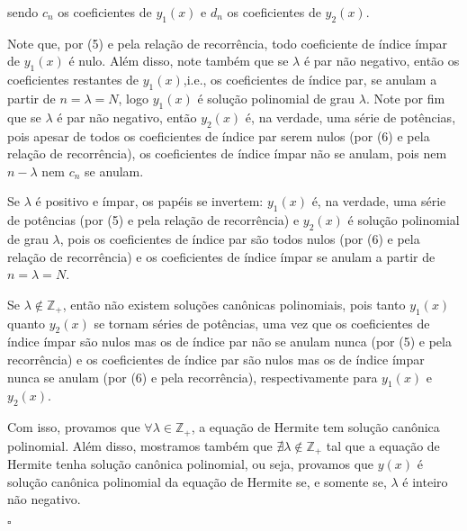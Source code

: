 \documentclass{article}
\begin{document}
sendo $c_n$ os coeficientes de $y_1(x)$ e $d_n$ os coeficientes de $y_2(x)$.
\vspace{0.2cm}
\par Note que, por (5) e pela relação de recorrência, todo coeficiente de índice ímpar de $y_1(x)$ é nulo. Além disso, note também que se $\lambda$ é par não negativo, então os coeficientes restantes de $y_1(x)$,i.e., os coeficientes de índice par, se anulam a partir de $n = \lambda = N$, logo $y_1(x)$ é solução polinomial de grau $\lambda$. Note por fim que se $\lambda $ é par não negativo, então $y_2(x)$ é, na verdade, uma série de potências, pois apesar de todos os coeficientes de índice par serem nulos (por (6) e pela relação de recorrência), os coeficientes de índice ímpar não se anulam, pois nem $n- \lambda$ nem $c_n$ se anulam. 
\vspace{0.2cm}
\par Se $\lambda$ é positivo e ímpar, os papéis se invertem: $y_1(x)$ é, na verdade, uma série de potências (por (5) e pela relação de recorrência) e $y_2(x)$ é solução polinomial de grau $\lambda$, pois os coeficientes de índice par são todos nulos (por (6) e pela relação de recorrência) e os coeficientes de índice ímpar se anulam a partir de $n = \lambda = N$. 
\vspace{0.2cm}
\par Se $\lambda\notin\mathbb{Z_{+}}$, então não existem soluções canônicas polinomiais, pois tanto $y_1(x)$ quanto $y_2(x)$ se tornam séries de potências, uma vez que os coeficientes de índice ímpar são nulos mas os de índice par não se anulam nunca (por (5) e pela recorrência) e os coeficientes de índice par são nulos mas os de índice ímpar nunca se anulam (por (6) e pela recorrência), respectivamente para $y_1(x)$ e $y_2(x)$. 
\vspace{0.2cm}
\par Com isso, provamos que $\forall \lambda\in\mathbb{Z_{+}}$, a equação de Hermite tem solução canônica polinomial. Além disso, mostramos também que $\nexists\lambda\notin\mathbb{Z_{+}}$ tal que a equação de Hermite tenha solução canônica polinomial, ou seja, provamos que $y(x)$ é solução canônica polinomial da equação de Hermite se, e somente se, $\lambda$ é inteiro não negativo. 
\begin{flushright}
	$\square$
\end{flushright}  
\end{document}
